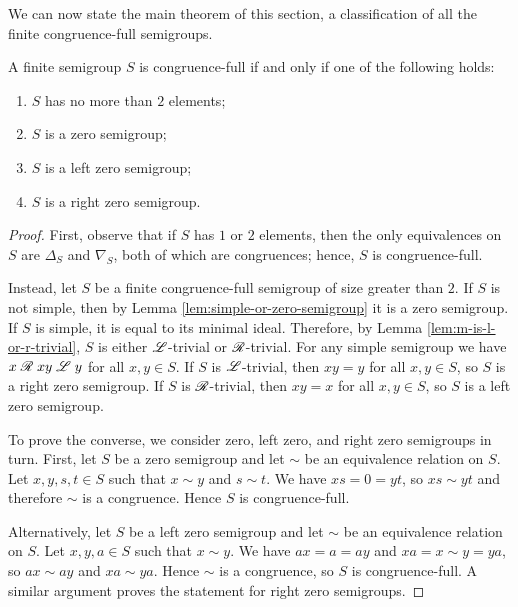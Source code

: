 We can now state the main theorem of this section, a classification of all the
finite congruence-full semigroups.

\begin{theorem}
  \label{thm:congruence-full}
  A finite semigroup $S$ is congruence-full if and only if one of the following
  holds:
  \begin{enumerate}[\rm(i)]
  \item $S$ has no more than $2$ elements;
  \item $S$ is a zero semigroup;
  \item $S$ is a left zero semigroup;
  \item $S$ is a right zero semigroup.
  \end{enumerate}
  \begin{proof}
    First, observe that if $S$ has $1$ or $2$ elements, then the only
    equivalences on $S$ are $\Delta_S$ and $\nabla_S$, both of which are
    congruences; hence, $S$ is congruence-full.

    Instead, let $S$ be a finite congruence-full semigroup of size greater than
    $2$.  If $S$ is not simple, then by Lemma \ref{lem:simple-or-zero-semigroup}
    it is a zero semigroup.  If $S$ is simple, it is equal to its minimal ideal.
    Therefore, by Lemma \ref{lem:m-is-l-or-r-trivial}, $S$ is either
    $\mathrel{\mathscr{L}}$-trivial or $\mathrel{\mathscr{R}}$-trivial.  For any simple semigroup we have
    $x \mathrel{\mathscr{R}} xy \mathrel{\mathscr{L}} y$ for all $x,y \in S$.  If $S$ is $\mathrel{\mathscr{L}}$-trivial, then $xy=y$
    for all $x,y \in S$, so $S$ is a right zero semigroup.  If $S$ is
    $\mathrel{\mathscr{R}}$-trivial, then $xy=x$ for all $x,y \in S$, so $S$ is a left zero
    semigroup.

    To prove the converse, we consider zero, left zero, and right zero
    semigroups in turn.  First, let $S$ be a zero semigroup and let $\sim$ be an
    equivalence relation on $S$.  Let $x,y,s,t \in S$ such that $x \sim y$ and
    $s \sim t$.  We have $xs = 0 = yt$, so $xs \sim yt$ and therefore $\sim$ is
    a congruence.  Hence $S$ is congruence-full.

    Alternatively, let $S$ be a left zero semigroup and let $\sim$ be an
    equivalence relation on $S$.  Let $x,y,a \in S$ such that $x \sim y$.  We
    have $ax = a = ay$ and $xa = x \sim y = ya$, so $ax \sim ay$ and
    $xa \sim ya$.  Hence $\sim$ is a congruence, so $S$ is congruence-full.
    A similar argument proves the statement for right zero semigroups.
  \end{proof}
\end{theorem}

